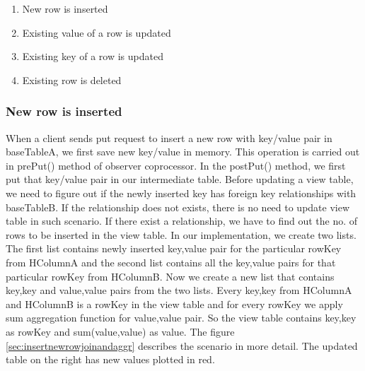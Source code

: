 \documentclass[11pt,a4paper,bibtotoc,idxtotoc,headsepline,footsepline,footexclude,BCOR12mm,DIV13]{scrbook}
\begin{document}

\begin{enumerate}
	\item New row is inserted
	\item Existing value of a row is updated
	\item Existing key of a row is updated
	\item Existing row is deleted
\end{enumerate}

\subsubsection{New row is inserted}
\label{sssec:newRowInsert}

When a client sends put request to insert a new row with key/value pair in baseTableA, we first save new key/value in memory. This operation is carried out in prePut() method of observer coprocessor. In the postPut() method, we first put that key/value pair in our intermediate table. Before updating a view table, we need to figure out if the newly inserted key has foreign key relationships with baseTableB. If the relationship does not exists, there is no need to update view table in such scenario. If there exist a relationship, we have to find out the no. of rows to be inserted in the view table. In our implementation, we create two lists. The first list contains newly inserted key,value pair for the particular rowKey from HColumnA and the second list contains all the key,value pairs for that particular rowKey from HColumnB. Now we create a new list that contains key,key and value,value pairs from the two lists. Every key,key from HColumnA and HColumnB is a rowKey in the view table and for every rowKey we apply sum aggregation function for value,value pair. So the view table contains key,key as rowKey and sum(value,value) as value. The figure \ref{sec:insertnewrowjoinandaggr} describes the scenario in more detail. The updated table on the right has new values plotted in red. 

\end{document}
